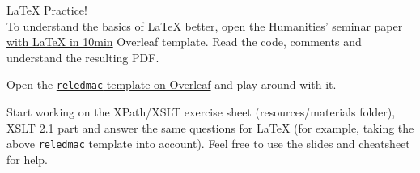 \begin{frame}[standout]
    \alert{\LaTeX{} Practice!} \\
    \normalsize
    To understand the basics of \LaTeX{} better, open the \alert{\href{https://www.overleaf.com/latex/templates/a-humanities-seminar-paper-with-latex-in-10min/zdnfrdtfcsdz}{Humanities' seminar paper with LaTeX in 10min} Overleaf template}. Read the code, comments and understand the resulting PDF.
    
    Open the \alert{\href{https://www.overleaf.com/latex/examples/typesetting-scholarly-critical-editions-with-reledmac/vwfgrsxqncvv}{\texttt{reledmac} template on Overleaf}} and play around with it. 
    
    Start working on the XPath/XSLT exercise sheet (resources/materials folder), XSLT 2.1 part and answer the same questions for \LaTeX{} (for example, taking the above \texttt{reledmac} template into account). Feel free to use the slides and cheatsheet for help.
    
\end{frame}





